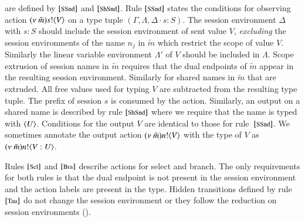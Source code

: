  are defined by ${\footnotesize [\textrm{SSnd}]}$
and ${\footnotesize [\textrm{ShSnd}]}$.  
Rule ${\footnotesize [\textrm{SSnd}]}$ states the conditions for observing action
$(\nu\ \tilde{m}) s ! \langle V \rangle$ on a type tuple 
$(\Gamma, \Lambda, \Delta \cdot s: S)$. 
The session environment $\Delta$ with $s: S$ 
should include the session environment of sent value $V$, 
{\em excluding} the session environments of the name $n_j$ 
in $\tilde{m}$ which restrict the scope of value $V$. 
Similarly the linear variable environment 
$\Lambda'$ of $V$ should be included in $\Lambda$. 
Scope extrusion of session names in $\tilde{m}$ requires
that the dual endpoints of $\tilde{m}$ appear in
the resulting session environment. Similarly for shared 
names in $\tilde{m}$ that are extruded.  
All free values used for typing $V$ are subtracted from the
resulting type tuple. The prefix of session $s$ is consumed
by the action.
Similarly, an output on a shared name is described
by rule ${\footnotesize [\textrm{ShSnd}]}$ where we require that the name
is typed with $\langle U \rangle$. Conditions for
the output $V$ are identical to those
for rule~${\footnotesize [\textrm{SSnd}]}$.
We sometimes annotate the output action 
$(\nu\ \tilde{m}) n ! \langle V \rangle$
with the type of $V$ as $(\nu\ \tilde{m}) n ! \langle V:U \rangle$.

Rules ${\footnotesize [\textrm{Sel}]}$ and ${\footnotesize [\textrm{Bra}]}$ describe actions for
select and branch. The only requirements for both
rules is that the dual endpoint is not present in the session
environment and the action labels are present
in the type.
Hidden transitions defined by rule ${\footnotesize [\textrm{Tau}]}$ 
do not change the session environment or they follow the reduction on session
environments (). 


